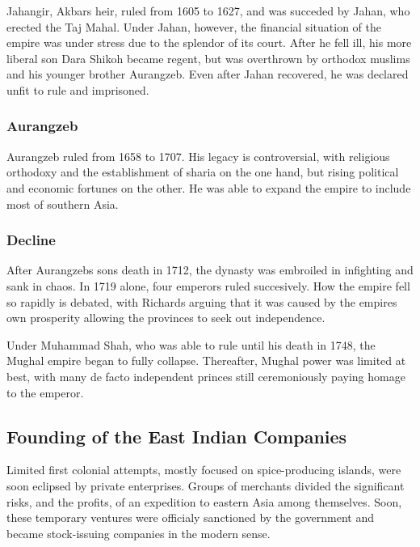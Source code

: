 \documentclass[11pt, a4paper, headings=standardclasses]{scrartcl}
\begin{document}
Jahangir, Akbars heir, ruled from 1605 to 1627, and was succeded by Jahan, who erected the Taj Mahal. Under Jahan, however, the financial situation of the empire was under stress due to the splendor of its court.\autocite[Chapter 6]{richards} After he fell ill, his more liberal son Dara Shikoh became regent, but was overthrown by orthodox muslims and his younger brother Aurangzeb. Even after Jahan recovered, he was declared unfit to rule and imprisoned.\autocite[Chapter 7]{richards}

\subsubsection{Aurangzeb}

Aurangzeb ruled from 1658 to 1707\autocite[165]{richards}. His legacy is controversial, with religious orthodoxy and the establishment of sharia on the one hand, but rising political and economic fortunes on the other. He was able to expand the empire to include most of southern Asia.\autocite[Chapter 8]{richards}

\subsubsection{Decline}

After Aurangzebs sons death in 1712, the dynasty was embroiled in infighting and sank in chaos. In 1719 alone, four emperors ruled succesively.\autocite[Chapter 12]{richards} How the empire fell so rapidly is debated, with Richards arguing that it was caused by the empires own prosperity allowing the provinces to seek out independence.\autocite{MughalFinances}

Under Muhammad Shah, who was able to rule until his death in 1748, the Mughal empire began to fully collapse. Thereafter, Mughal power was limited at best, with many de facto independent princes still ceremoniously paying homage to the emperor.\autocite{bose}

\subsection{Founding of the East Indian Companies}

Limited first colonial attempts, mostly focused on spice-producing islands, were soon eclipsed by private enterprises. Groups of merchants divided the significant risks, and the profits, of an expedition to eastern Asia among themselves. Soon, these temporary ventures were officialy sanctioned by the government and became stock-issuing companies in the modern sense.
\end{document}

